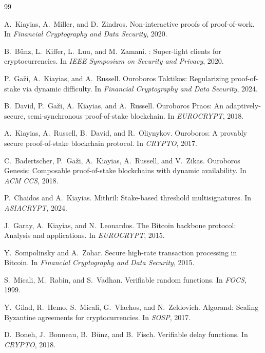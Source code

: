 \documentclass[11pt]{article}
\begin{document}

\begin{thebibliography}{99}

A.~Kiayias, A.~Miller, and D.~Zindros.
\newblock Non-interactive proofs of proof-of-work.
\newblock In \emph{Financial Cryptography and Data Security}, 2020.

B.~B\"{u}nz, L.~Kiffer, L.~Luu, and M.~Zamani.
: Super-light clients for cryptocurrencies.
\newblock In \emph{IEEE Symposium on Security and Privacy}, 2020.

P.~Ga\v{z}i, A.~Kiayias, and A.~Russell.
\newblock Ouroboros {Taktikos}: Regularizing proof-of-stake via dynamic difficulty.
\newblock In \emph{Financial Cryptography and Data Security}, 2024.

B.~David, P.~Ga\v{z}i, A.~Kiayias, and A.~Russell.
\newblock Ouroboros {Praos}: An adaptively-secure, semi-synchronous proof-of-stake blockchain.
\newblock In \emph{EUROCRYPT}, 2018.

A.~Kiayias, A.~Russell, B.~David, and R.~Oliynykov.
\newblock Ouroboros: A provably secure proof-of-stake blockchain protocol.
\newblock In \emph{CRYPTO}, 2017.

C.~Badertscher, P.~Ga\v{z}i, A.~Kiayias, A.~Russell, and V.~Zikas.
\newblock Ouroboros {Genesis}: Composable proof-of-stake blockchains with dynamic availability.
\newblock In \emph{ACM CCS}, 2018.

P.~Chaidos and A.~Kiayias.
\newblock Mithril: Stake-based threshold multisignatures.
\newblock In \emph{ASIACRYPT}, 2024.

J.~Garay, A.~Kiayias, and N.~Leonardos.
\newblock The {Bitcoin} backbone protocol: Analysis and applications.
\newblock In \emph{EUROCRYPT}, 2015.

Y.~Sompolinsky and A.~Zohar.
\newblock Secure high-rate transaction processing in {Bitcoin}.
\newblock In \emph{Financial Cryptography and Data Security}, 2015.

S.~Micali, M.~Rabin, and S.~Vadhan.
\newblock Verifiable random functions.
\newblock In \emph{FOCS}, 1999.

Y.~Gilad, R.~Hemo, S.~Micali, G.~Vlachos, and N.~Zeldovich.
\newblock Algorand: Scaling {Byzantine} agreements for cryptocurrencies.
\newblock In \emph{SOSP}, 2017.

D.~Boneh, J.~Bonneau, B.~B\"{u}nz, and B.~Fisch.
\newblock Verifiable delay functions.
\newblock In \emph{CRYPTO}, 2018.


\end{thebibliography}
\end{document}
